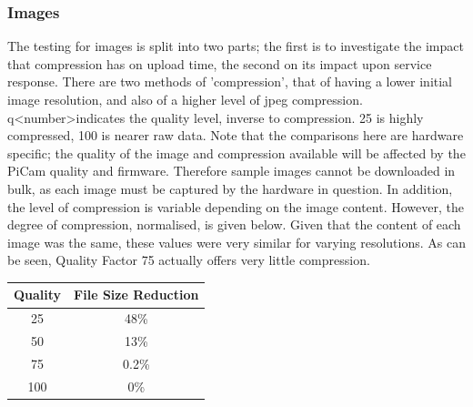 \documentclass{article}
\begin{document}
\subsubsection{Images}
The testing for images is split into two parts; the first is to investigate the impact that compression has on upload time, the second on its impact upon service response. There are two methods of 'compression', that of having a lower initial image resolution, and also of a higher level of jpeg compression. q\textless number\textgreater indicates the quality level, inverse to compression. 25 is highly compressed, 100 is nearer raw data. Note that the comparisons here are hardware specific; the quality of the image and compression available will be affected by the PiCam quality and firmware. Therefore sample images cannot be downloaded in bulk, as each image must be captured by the hardware in question. In addition, the level of compression is variable depending on the image content. However, the degree of compression, normalised, is given below. Given that the content of each image was the same, these values were very similar for varying resolutions. As can be seen, Quality Factor 75 actually offers very little compression. 
\begin{table}[h]
\centering
\begin{tabular}{| c | c |}
\hline
Quality & File Size Reduction\\ \hline
25 & 48\% \\ \hline
50 & 13\% \\ \hline
75 & 0.2\% \\ \hline
100 & 0\% \\ \hline
\end{tabular}
\end{table}
\end{document}
